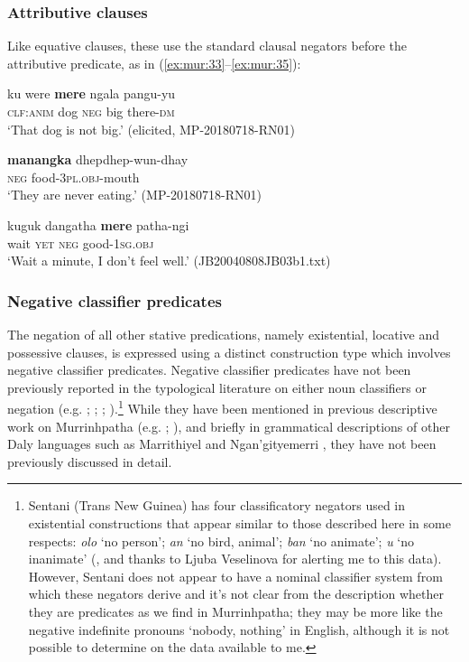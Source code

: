 \documentclass[output=paper,colorlinks,citecolor=brown]{langscibook}
\begin{document}
\subsubsection{Attributive clauses} \label{sec:mur:2.3.2}

Like equative clauses, these use the standard clausal negators before the attributive predicate, as in (\ref{ex:mur:33}--\ref{ex:mur:35}):

\ea\label{ex:mur:33}
    \gll ku were \textbf{mere} ngala pangu-yu\\
         \textsc{clf:anim} dog \textsc{neg} big there-\textsc{dm}\\
    \glt ‘That dog is not big.’ (elicited, MP-20180718-RN01)
\z 

\ea\label{ex:mur:34}
    \gll \textbf{manangka} dhepdhep-wun-dhay \\
         \textsc{neg} food-\textsc{3pl.obj}{}-mouth\\
    \glt  ‘They are never eating.’ (MP-20180718-RN01)
\z 

\ea\label{ex:mur:35}
    \gll kuguk dangatha \textbf{mere} patha-ngi\\
         wait \textsc{yet} \textsc{neg} good-\textsc{1sg.obj}\\
    \glt ‘Wait a minute, I don’t feel well.’ (JB20040808JB03b1.txt)
\z

\subsubsection{Negative classifier predicates} \label{sec:mur:2.3.3}

The negation of all other stative predications, namely existential, locative and possessive clauses, is expressed using a distinct construction type which involves negative classifier predicates. Negative classifier predicates have not been previously reported in the typological literature on either noun classifiers or negation (e.g. \citealt{Aikhenvald2003}; \citealt{Miestamo2007}; \citealt{Eriksen2011}; \citealt{Veselinova2013neg.exist}).\footnote{Sentani (Trans New Guinea) has four classificatory negators used in existential constructions that appear similar to those described here in some respects: \textit{olo} ‘no person’; \textit{an} ‘no bird, animal’; \textit{ban} ‘no animate’; \textit{u} ‘no inanimate’ (\citealt{Hartzler1994}, and thanks to Ljuba Veselinova for alerting me to this data). However, Sentani does not appear to have a nominal classifier system from which these negators derive and it’s not clear from the description whether they are predicates as we find in Murrinhpatha; they may be more like the negative indefinite pronouns ‘nobody, nothing’ in English, although it is not possible to determine on the data available to me.} While they have been mentioned in previous descriptive work on Murrinhpatha (e.g. \citealt{Walsh1976}; \citealt{Blythe2009}), and briefly in grammatical descriptions of other Daly languages such as Marrithiyel \citep{Green1989} and Ngan’gityemerri \citep{Reid2011}, they have not been previously discussed in detail. 
\end{document}
